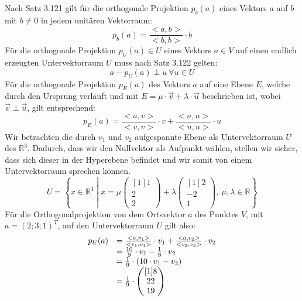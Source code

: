 \documentclass[main.tex]{subfiles}
\begin{document}
Nach Satz 3.121 gilt für die orthogonale Projektion $p_{b}( a)$ eines Vektors $a$ auf $b$ mit $b\neq 0$ in jedem unitären Vektorraum:
\begin{equation*}
p_{b}( a) =\frac{< a,b> }{< b,b> } \cdot b
\end{equation*}
Für die orthogonale Projektion $p_{U}( a) \in U$ eines Vektors $a\in V$ auf einen endlich erzeugten Untervektorraum $U$ muss nach Satz 3.122 gelten:
\begin{equation*}
a-p_{U}( a) \perp u\ \forall u\in U
\end{equation*}
Für die orthogonale Projektion $p_{E}( a)$ des Vektors $a$ auf eine Ebene $E$, welche durch den Ursprung verläuft und mit $E=\mu \cdot \vec{v} +\lambda \cdot \vec{u}$ beschrieben ist, wobei $\vec{v} \perp \vec{u}$, gilt entsprechend:
\begin{equation*}
p_{E}( a) =\frac{< a,v> }{< v,v> } \cdot v+\frac{< a,u> }{< u,u> } \cdot u
\end{equation*}
Wir betrachten die durch $v_{1}$ und $v_{2}$ aufgespannte Ebene als Untervektorraum $U$ des $\mathbb{R}^{3}$. Dadurch, dass wir den Nullvektor als Aufpunkt wählen, stellen wir sicher, dass sich dieser in der Hyperebene befindet und wir somit von einem Untervektorraum sprechen können.
\begin{equation*}
U=\left\{x\in \mathbb{R}^{3}\middle| x=\mu \begin{pmatrix}[1]
1\\
2\\
2
\end{pmatrix} +\lambda \begin{pmatrix}[1]
2\\
-2\\
1
\end{pmatrix} ,\ \mu ,\lambda \in \mathbb{R}\right\}
\end{equation*}
Für die Orthogonalprojektion von dem Ortsvektor $a$ des Punktes $V$, mit \ $a=( 2;3;1)^{T}$, auf den Untervektorraum $U$ gilt also:
\begin{equation*}
\begin{array}{ c l }
p_{U}( a) & =\frac{< a,v_{1}> }{< v_{1} ,v_{1}> } \cdot v_{1} +\frac{< a,v_{2}> }{< v_{2} ,v_{2}> } \cdot v_{2}\\
 & =\frac{10}{9} \cdot v_{1} -\frac{1}{9} \cdot v_{2}\\
 & =\frac{1}{9} \cdot ( 10\cdot v_{1} -v_{2})\\
 & =\frac{1}{9} \cdot \begin{pmatrix}[1]
8\\
22\\
19
\end{pmatrix}
\end{array}
\end{equation*}
\end{document}
